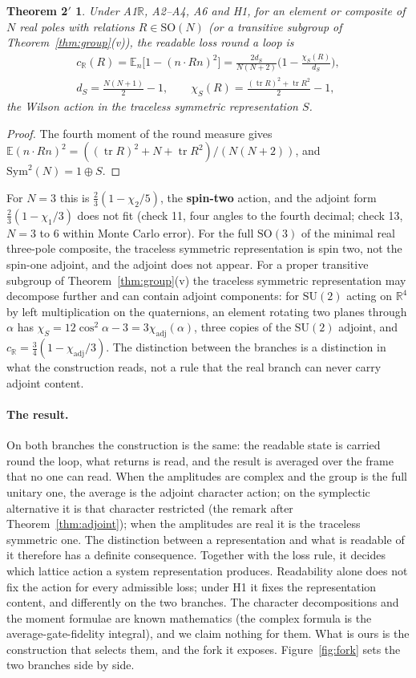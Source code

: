 \documentclass[11pt,a4paper]{article}
\theoremstyle{plain}
\newtheorem*{theorem2p}{Theorem 2$'$}
\theoremstyle{definition}
\theoremstyle{remark}
\newcommand{\tr}{\operatorname{tr}}
\newcommand{\E}{\mathbb{E}}
\newcommand{\R}{\mathbb{R}}
\newcommand{\SO}{\mathrm{SO}}
\newcommand{\SU}{\mathrm{SU}}
\newcommand{\adj}{\mathrm{adj}}
\newcommand{\Sym}{\mathrm{Sym}}
\begin{document}
\begin{theorem2p}
Under A1$\R$, A2--A4, A6 and H1, for an element or composite of $N$ real poles with relations $R\in\SO(N)$ (or a transitive subgroup of Theorem~\ref{thm:group}(v)), the readable loss round a loop is
\begin{gather}
c_{\R}(R)=\E_n\big[1-(n\cdot Rn)^2\big]=\frac{2d_S}{N(N+2)}\Big(1-\frac{\chi_S(R)}{d_S}\Big),\\
d_S=\frac{N(N+1)}{2}-1,\qquad \chi_S(R)=\frac{(\tr R)^2+\tr R^2}{2}-1,\nonumber
\end{gather}
the Wilson action in the traceless symmetric representation $S$.
\end{theorem2p}
\begin{proof}
The fourth moment of the round measure gives $\E(n\cdot Rn)^2=((\tr R)^2+N+\tr R^2)/(N(N+2))$, and $\Sym^2(N)=1\oplus S$.
\end{proof}
For $N=3$ this is $\tfrac23(1-\chi_2/5)$, the \textbf{spin-two} action, and the adjoint form $\tfrac23(1-\chi_1/3)$ does not fit (check 11, four angles to the fourth decimal; check 13, $N=3$ to $6$ within Monte Carlo error). For the full $\SO(3)$ of the minimal real three-pole composite, the traceless symmetric representation is spin two, not the spin-one adjoint, and the adjoint does not appear. For a proper transitive subgroup of Theorem~\ref{thm:group}(v) the traceless symmetric representation may decompose further and can contain adjoint components: for $\SU(2)$ acting on $\R^4$ by left multiplication on the quaternions, an element rotating two planes through $\alpha$ has $\chi_S=12\cos^2\alpha-3=3\chi_{\adj}(\alpha)$, three copies of the $\SU(2)$ adjoint, and $c_\R=\tfrac34(1-\chi_{\adj}/3)$. The distinction between the branches is a distinction in what the construction reads, not a rule that the real branch can never carry adjoint content.

\paragraph{The result.} On both branches the construction is the same: the readable state is carried round the loop, what returns is read, and the result is averaged over the frame that no one can read. When the amplitudes are complex and the group is the full unitary one, the average is the adjoint character action; on the symplectic alternative it is that character restricted (the remark after Theorem~\ref{thm:adjoint}); when the amplitudes are real it is the traceless symmetric one. The distinction between a representation and what is readable of it therefore has a definite consequence. Together with the loss rule, it decides which lattice action a system representation produces. Readability alone does not fix the action for every admissible loss; under H1 it fixes the representation content, and differently on the two branches. The character decompositions and the moment formulae are known mathematics (the complex formula is the average-gate-fidelity integral), and we claim nothing for them. What is ours is the construction that selects them, and the fork it exposes. Figure~\ref{fig:fork} sets the two branches side by side.
\end{document}
